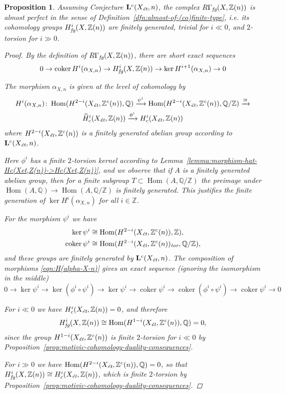 \documentclass[leqno,12pt]{article}
\theoremstyle{plain}
\newtheorem{proposition}[theorem]{\indent\sc Proposition}
\theoremstyle{definition}
\DeclareMathOperator{\Hom}{Hom}
\DeclareMathOperator{\coker}{coker}
\newcommand{\QQ}{\mathbb{Q}}
\newcommand{\ZZ}{\mathbb{Z}}
\newcommand{\tor}{\text{\it tor}}
\newcommand{\et}{\text{\it \'{e}t}}
\newcommand{\fg}{\text{\it fg}}
\begin{document}
\begin{proposition}
  \label{prop:RGammafg-almost-perfect}
  Assuming Conjecture $\mathbf{L}^c (X_\et, n)$, the complex
  $R\Gamma_\fg (X, \ZZ (n))$ is almost perfect in the sense of
  Definition~{\rm\ref{dfn:almost-of-(co)finite-type}}, i.e. its cohomology
  groups $H^i_\fg (X, \ZZ (n))$ are finitely generated, trivial for $i \ll 0$,
  and $2$-torsion for $i \gg 0$.

  \begin{proof}
    By the definition of $R\Gamma_\fg (X, \ZZ (n))$, there are short exact
    sequences
    \[ 0 \to \coker H^i (\alpha_{X,n}) \to
      H^i_\fg (X, \ZZ (n)) \to
      \ker H^{i+1} (\alpha_{X,n}) \to 0 \]

    The morphism $\alpha_{X,n}$ is given at the level of cohomology by
    \begin{multline}
      \label{eqn:H(alpha-X-n)}
      H^i (\alpha_{X,n})\colon
      \Hom (H^{2-i} (X_\et, \ZZ^c (n)), \QQ) \xrightarrow{\psi^i}
      \Hom (H^{2-i} (X_\et, \ZZ^c (n)), \QQ/\ZZ) \xrightarrow{\cong} \\
      \widehat{H}^i_c (X_\et, \ZZ (n)) \xrightarrow{\phi^i} H^i_c (X_\et, \ZZ (n))
    \end{multline}
    where $H^{2-i} (X_\et, \ZZ^c (n))$ is a finitely generated abelian group
    according to $\mathbf{L}^c (X_\et, n)$.

    Here $\phi^i$ has a finite $2$-torsion kernel according to
    Lemma~\ref{lemma:morphism-hat-Hc(Xet,Z(n))->Hc(Xet,Z(n))}, and we observe
    that if $A$ is a finitely generated abelian group, then for a finite
    subgroup $T \subset \Hom (A, \QQ/\ZZ)$ the preimage under
    $\Hom (A, \QQ) \to \Hom (A, \QQ/\ZZ)$ is finitely generated. This
    justifies the finite generation of $\ker H^i (\alpha_{X,n})$ for all
    $i \in \ZZ$.

    For the morphism $\psi^i$ we have
    \begin{align*}
      \ker \psi^i & \cong \Hom (H^{2-i} (X_\et, \ZZ^c (n)), \ZZ), \\
      \coker \psi^i & \cong \Hom (H^{2-i} (X_\et, \ZZ^c (n))_\tor, \QQ/\ZZ),
    \end{align*}
    and these groups are finitely generated by $\mathbf{L}^c (X_\et, n)$. The
    composition of morphisms \eqref{eqn:H(alpha-X-n)} gives an exact sequence
    (ignoring the isomorphism in the middle)
    \[
      0 \to \ker\psi^i \to \ker (\phi^i\circ\psi^i) \to \ker\psi^i \to
      \coker\psi^i \to \coker (\phi^i\circ \psi^i) \to \coker\psi^i \to 0
    \]

    For $i \ll 0$ we have $H^i_c (X_\et, \ZZ (n)) = 0$, and therefore
    $$H^i_\fg (X, \ZZ (n)) \cong \Hom (H^{1-i} (X_\et, \ZZ^c (n)), \QQ) = 0,$$
    since the group $H^{1-i} (X_\et, \ZZ^c (n))$ is finite $2$-torsion for
    $i \ll 0$ by Proposition~\ref{prop:motivic-cohomology-duality-consequences}.

    For $i \gg 0$ we have $\Hom (H^{2-i} (X_\et, \ZZ^c (n)), \QQ) = 0$, so that
    $H^i_\fg (X, \ZZ (n)) \cong H^i_c (X_\et, \ZZ (n))$, which is finite
    $2$-torsion by
    Proposition~\ref{prop:motivic-cohomology-duality-consequences}.
  \end{proof}
\end{proposition}
\end{document}
